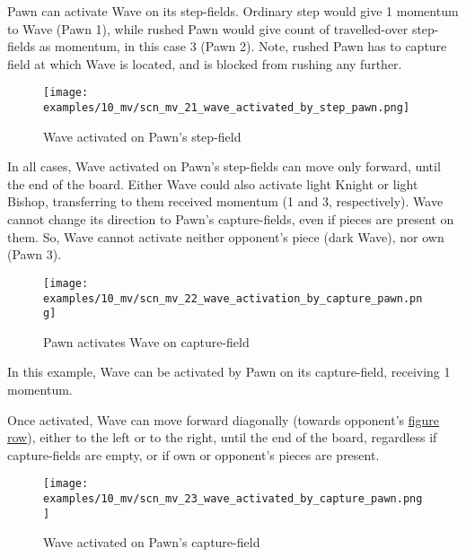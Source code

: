 Pawn can activate Wave on its step-fields. Ordinary step would give 1 momentum to
Wave (Pawn 1), while rushed Pawn would give count of travelled-over step-fields as
momentum, in this case 3 (Pawn 2). Note, rushed Pawn has to capture field at which
Wave is located, and is blocked from rushing any further.

\clearpage %

\vspace*{-2.1\baselineskip}
\noindent
\begin{figure}[!h]
\texttt{[image: examples/10\_mv/scn\_mv\_21\_wave\_activated\_by\_step\_pawn.png]}
\caption{Wave activated on Pawn's step-field}
\label{fig:scn_mv_21_wave_activated_by_step_pawn}
\end{figure}

In all cases, Wave activated on Pawn's step-fields can move only forward, until the end
of the board. Either Wave could also activate light Knight or light Bishop, transferring
to them received momentum (1 and 3, respectively). Wave cannot change its direction to
Pawn's capture-fields, even if pieces are present on them. So, Wave cannot activate neither
opponent's piece (dark Wave), nor own (Pawn 3).

\clearpage %

\vspace*{-2.1\baselineskip}
\noindent
\begin{figure}[!h]
\texttt{[image: examples/10\_mv/scn\_mv\_22\_wave\_activation\_by\_capture\_pawn.png]}
\caption{Pawn activates Wave on capture-field}
\label{fig:scn_mv_22_wave_activation_by_capture_pawn}
\end{figure}

In this example, Wave can be activated by Pawn on its capture-field, receiving 1 momentum.

Once activated, Wave can move forward diagonally (towards opponent's
\hyperref[sec:Terms/Figure row]{figure row}), either to the left or to the right, until the
end of the board, regardless if capture-fields are empty, or if own or opponent's pieces are
present.

\clearpage %

\vspace*{-2.1\baselineskip}
\noindent
\begin{figure}[!h]
\texttt{[image: examples/10\_mv/scn\_mv\_23\_wave\_activated\_by\_capture\_pawn.png]}
\caption{Wave activated on Pawn's capture-field}
\label{fig:scn_mv_23_wave_activated_by_capture_pawn}
\end{figure}

